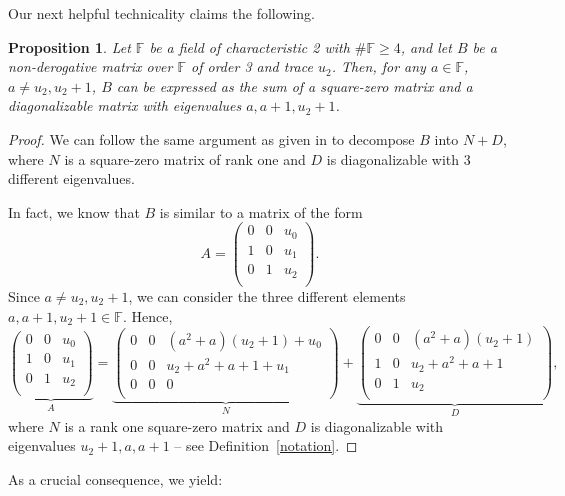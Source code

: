 \documentclass{amsart}
\def\FF{\mathbb{F}}
\newtheorem{proposition}[theorem]{Proposition}
\theoremstyle{definition}
\theoremstyle{remark}
\numberwithin{equation}{section}
\begin{document}
Our next helpful technicality claims the following.

\begin{proposition}\label{case3}
Let $\FF$ be a field of characteristic 2 with $\#\FF\ge4$, and let $B$ be a non-derogative matrix over $\FF$ of order 3 and trace $u_2$. Then, for any $a\in \mathbb{F}$, $a\ne u_2,u_2+1$, $B$ can be expressed as the sum of a square-zero matrix and a diagonalizable matrix with eigenvalues $a,a+1,u_2+1$.
\end{proposition}

\begin{proof}
We can follow the same argument as given in \cite[Lemma 3.1]{DGL1} to decompose $B$ into $N+D$, where $N$ is a square-zero matrix of rank one and $D$ is diagonalizable with 3 different eigenvalues.

In fact, we know that $B$ is similar to a matrix of the form
 $$A=\left(
  \begin{array}{ccc}
     0 & 0 & u_0 \\
     1 & 0 & u_1 \\
     0 & 1 & u_2 \\
  \end{array}
\right).$$
Since $a\ne u_2,u_2+1$, we can consider the three different elements $a,a+1,u_2+1\in \mathbb{F}$. Hence,
$$\underbrace{\left(
  \begin{array}{ccc}
     0 & 0 & u_0 \\
     1 & 0 & u_1 \\
     0 & 1 & u_2 \\
  \end{array}
\right)}_A=\underbrace{\left(
  \begin{array}{ccc}
     0 & 0 & (a^2+a)(u_2+1)+u_0 \\
     0 & 0 & u_2+a^2+a+1+u_1 \\
     0 & 0 & 0 \\
  \end{array}
\right)}_N+\underbrace{\left(
  \begin{array}{ccc}
     0 & 0 & (a^2+a)(u_2+1) \\
     1 & 0 & u_2+a^2+a+1 \\
     0 & 1 & u_2 \\
  \end{array}
\right)}_D,$$
where $N$ is a rank one square-zero matrix and $D$ is diagonalizable with eigenvalues $u_2+1, a, a+1$ -- see Definition~\ref{notation}.
\end{proof}

As a crucial consequence, we yield:
\end{document}
